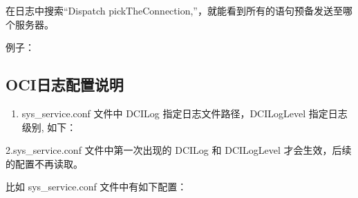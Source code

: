 \documentclass[letterpaper,10pt,english]{sphinxmanual}
\begin{document}
在日志中搜索“Dispatch pickTheConnection,”，就能看到所有的语句预备发送至哪个服务器。

例子：

\begin{sphinxVerbatim}[commandchars=\\\{\}]
\PYG{p}{[}\PYG{p}{]}\PYG{p}{[} \PYG{p}{]}              
\end{sphinxVerbatim}


\subsection{OCI日志配置说明}
\label{\detokenize{interface/oci-v7:id2}}\begin{enumerate}
%
\item {} 
sys\_service.conf 文件中 DCILog 指定日志文件路径，DCILogLevel 指定日志级别, 如下：

\end{enumerate}

\begin{sphinxVerbatim}[commandchars=\\\{\}]
\end{sphinxVerbatim}

2.sys\_service.conf 文件中第一次出现的 DCILog 和 DCILogLevel 才会生效，后续的配置不再读取。

比如 sys\_service.conf 文件中有如下配置：

\begin{sphinxVerbatim}[commandchars=\\\{\}]
\PYG{p}{[}\PYG{p}{]}

\PYG{p}{[}\PYG{p}{]}
\end{sphinxVerbatim}
\end{document}
